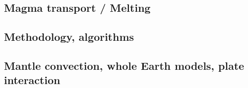 \subsection*{Magma transport / Melting}

\cite{yatd12}
\cite{lorg18}

\subsection*{Methodology, algorithms}

\cite{leka93}

\subsection*{Mantle convection, whole Earth models, plate interaction}

